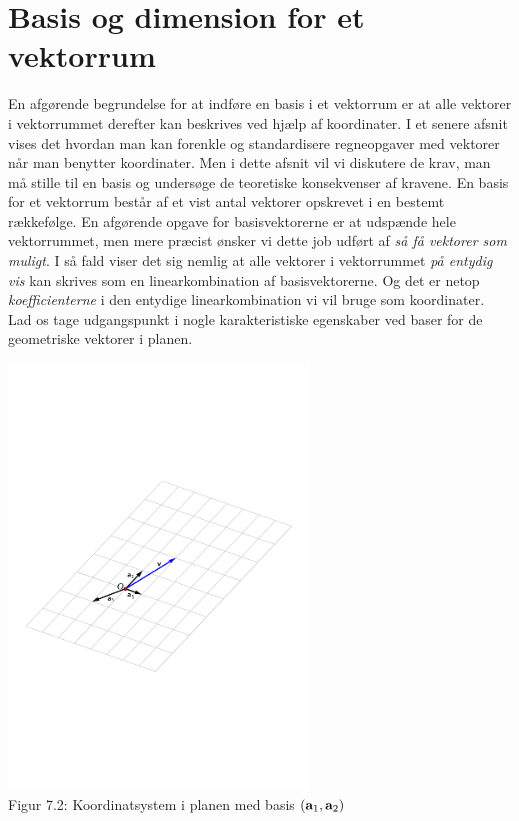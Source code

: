 \section{Basis og dimension for et vektorrum}

En afgørende begrundelse for at indføre en basis i et vektorrum er at alle vektorer i vektorrummet derefter kan beskrives ved hjælp af koordinater. I et senere afsnit vi\-ses det hvordan man kan forenkle og standardisere regneopgaver med vektorer når man benytter koordinater. Men i dette afsnit vil vi diskutere de krav, man må stille til en basis og undersøge de teoretiske konsekvenser af kravene.
\bs
En basis for et vektorrum består af et vist antal vektorer opskrevet i en bestemt rækkefølge. En afgørende opgave for basisvektorerne er at udspænde hele vektorrummet, men mere præcist ønsker vi dette job udført af \textit{så få vektorer som muligt}. I så fald viser det sig nemlig at alle vektorer i vektorrummet \textit{på entydig vis} kan skrives som en linearkombination af basisvektorerne. Og det er netop \textit{koefficienterne} i den entydige linearkombination vi vil bruge som koordinater.
\bs
Lad os tage udgangspunkt i nogle karakteristiske egenskaber ved baser for de geo\-metriske vektorer i planen.
\begin{center}
		\includegraphics[trim=4cm 12cm 5cm 12cm,width=0.60\textwidth,clip]{linKomb.pdf}	
		\\Figur 7.2: Koordinatsystem i planen med basis $(\mathbf{a}_1,\mathbf{a}_2)$			
\end{center}
